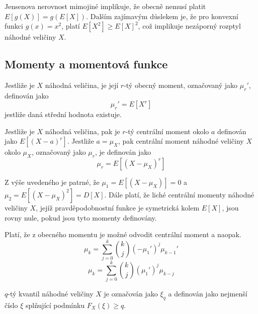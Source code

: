 Jensenova nerovnost mimojiné implikuje, že obecně nemusí platit $E[g(X)] = g(E[X])$. Dalším zajímavým důslekem  je, že pro konvexní funkci $g(x) = x^2$, platí $E[X^2] \ge E[X]^2$, což implikuje nezáporný rozptyl náhodné veličiny $X$.

\subsection{Momenty a momentová funkce}

\begin{definition}
Jestliže je $X$ náhodná veličina, je její $r$-tý obecný moment, označovaný jako $\mu_r'$, definován jako
\begin{equation*}
\mu_r' = E[X^r]
\end{equation*}
jestliže daná střední hodnota existuje.
\end{definition}

\begin{definition}
Jestliže je $X$ náhodná veličina, pak je $r$-tý centrální moment okolo $a$ definován jako $E[(X - a)^r]$. Jestliže $a = \mu_X$, pak centrální moment náhodné veličiny $X$ okolo $\mu_X$, označovaný jako $\mu_r$, je definován jako
\begin{equation*}
\mu_r = E[(X - \mu_X)^r]
\end{equation*}
\end{definition}

Z výše uvedeného je patrné, že $\mu_1 = E[(X - \mu_X)] = 0$ a $\mu_2 = E[(X - \mu_X)^2] = D[X]$. Dále platí, že liché centrální momenty náhodné veličiny $X$, jejíž pravděpodobnostní funkce je symetrická kolem $E[X]$, jsou rovny nule, pokud jsou tyto momenty definovány.

\begin{definition}
Platí, že z obecného momentu je možné odvodit centrální moment a naopak.
\begin{equation*}
\mu_k = \sum_{j = 0}^k \binom{k}{j}(-\mu_1')^j\mu_{k-1}'
\end{equation*}
\begin{equation*}
\mu_k = \sum_{j=0}^k \binom{k}{j} (\mu_1')^j\mu_{k-j}
\end{equation*}
\end{definition}

\begin{definition}[Kvantil]
$q$-tý kvantil náhodné veličiny $X$ je označován jako $\xi_q$ a definován jako nejmenší číslo $\xi$ splňující podmínku $F_X(\xi) \ge q$.
\end{definition}

